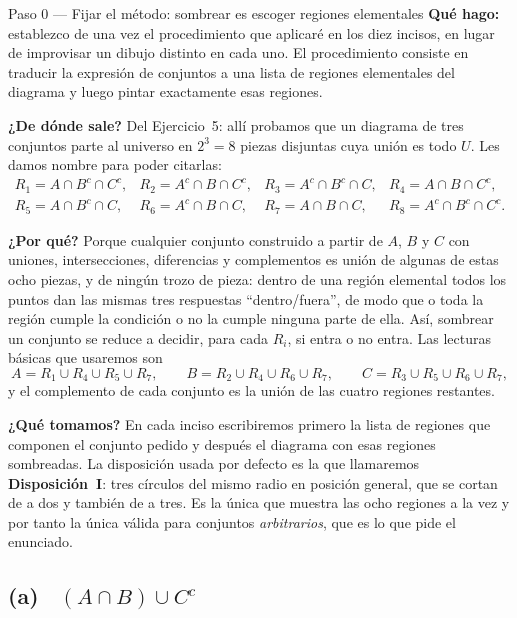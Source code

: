 \documentclass[11pt]{article}
\begin{document}
\begin{paso}{Paso 0 --- Fijar el método: sombrear es escoger regiones elementales}
\textbf{Qué hago:} establezco de una vez el procedimiento que aplicaré en los diez incisos, en
lugar de improvisar un dibujo distinto en cada uno. El procedimiento consiste en traducir la
expresión de conjuntos a una lista de regiones elementales del diagrama y luego pintar
exactamente esas regiones.

\textbf{¿De dónde sale?} Del Ejercicio~5: allí probamos que un diagrama de tres conjuntos parte
al universo en $2^{3}=8$ piezas disjuntas cuya unión es todo $U$. Les damos nombre para poder
citarlas:
\[
\begin{array}{llll}
R_{1}=A\cap B^{c}\cap C^{c}, & R_{2}=A^{c}\cap B\cap C^{c}, & R_{3}=A^{c}\cap B^{c}\cap C, & R_{4}=A\cap B\cap C^{c},\\[2pt]
R_{5}=A\cap B^{c}\cap C, & R_{6}=A^{c}\cap B\cap C, & R_{7}=A\cap B\cap C, & R_{8}=A^{c}\cap B^{c}\cap C^{c}.
\end{array}
\]

\textbf{¿Por qué?} Porque cualquier conjunto construido a partir de $A$, $B$ y $C$ con uniones,
intersecciones, diferencias y complementos es unión de algunas de estas ocho piezas, y de
ningún trozo de pieza: dentro de una región elemental todos los puntos dan las mismas tres
respuestas ``dentro/fuera'', de modo que o toda la región cumple la condición o no la cumple
ninguna parte de ella. Así, sombrear un conjunto se reduce a decidir, para cada $R_{i}$, si
entra o no entra. Las lecturas básicas que usaremos son
\[
A=R_{1}\cup R_{4}\cup R_{5}\cup R_{7},\qquad
B=R_{2}\cup R_{4}\cup R_{6}\cup R_{7},\qquad
C=R_{3}\cup R_{5}\cup R_{6}\cup R_{7},
\]
y el complemento de cada conjunto es la unión de las cuatro regiones restantes.

\textbf{¿Qué tomamos?} En cada inciso escribiremos primero la lista de regiones que componen el
conjunto pedido y después el diagrama con esas regiones sombreadas. La disposición usada por
defecto es la que llamaremos \textbf{Disposición~I}: tres círculos del mismo radio en posición
general, que se cortan de a dos y también de a tres. Es la única que muestra las ocho regiones
a la vez y por tanto la única válida para conjuntos \emph{arbitrarios}, que es lo que pide el
enunciado.
\end{paso}

\subsection*{(a) \ $(A\cap B)\cup C^{c}$}
\end{document}
